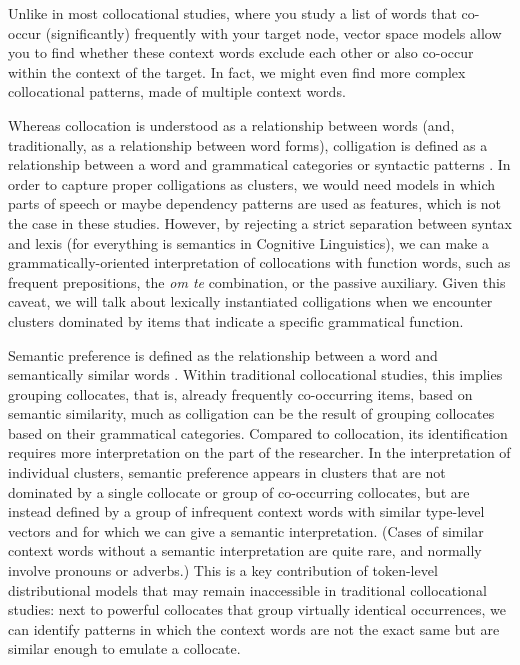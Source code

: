 \documentclass[
]{book}
\begin{document}
Unlike in most collocational studies, where you study a list of words that co-occur (significantly) frequently with your target node, vector space models allow you to find whether these context words exclude each other or also co-occur within the context of the target. In fact, we might even find more complex collocational patterns, made of multiple context words.

Whereas collocation is understood as a relationship between words (and, traditionally, as a relationship between word forms), colligation is defined as a relationship between a word and grammatical categories or syntactic patterns \autocites[ 14]{firth_1957a}[ 15]{sinclair_1998}[ 124]{stubbs_2009}. In order to capture proper colligations as clusters, we would need models in which parts of speech or maybe dependency patterns are used as features, which is not the case in these studies. However, by rejecting a strict separation between syntax and lexis
(for everything is semantics in Cognitive Linguistics),
we can make a grammatically-oriented interpretation of collocations with function words, such as frequent prepositions, the \emph{om te} combination, or the passive auxiliary. Given this caveat, we will talk about lexically instantiated colligations when we encounter clusters dominated by items that indicate a specific grammatical function.

Semantic preference is defined as the relationship between a word and semantically similar words \autocites[ 16]{sinclair_1998}[ 125]{stubbs_2009}[ 138-140]{mcenery.hardie_2012}. Within traditional collocational studies, this implies grouping collocates, that is, already frequently co-occurring items, based on semantic similarity, much as colligation can be the result of grouping collocates based on their grammatical categories. Compared to collocation, its identification requires more interpretation on the part of the researcher.
In the interpretation of individual clusters, semantic preference appears in clusters that are not dominated by a single collocate or group of co-occurring collocates, but are instead defined by a group of infrequent context words with similar type-level vectors and for which we can give a semantic interpretation. (Cases of similar context words without a semantic interpretation are quite rare, and normally involve pronouns or adverbs.) This is a key contribution of token-level distributional models that may remain inaccessible in traditional collocational studies: next to powerful collocates that group virtually identical occurrences, we can identify patterns in which the context words are not the exact same but are similar enough to emulate a collocate.
\end{document}

